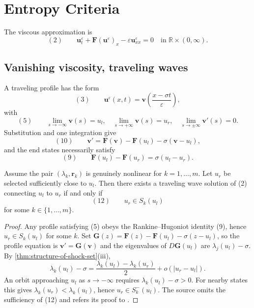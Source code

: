 \section{Entropy Criteria}\label{sec:entropy-criteria-systems}

The viscous approximation is
\[
(2)\qquad
\mathbf u_t^\varepsilon+\mathbf F(\mathbf u^\varepsilon)_x
-\varepsilon\mathbf u_{xx}^\varepsilon=0
\quad\text{in }\mathbb R\times(0,\infty).
\]

\subsection{Vanishing viscosity, traveling waves}\label{sec:vanishing-viscosity-traveling-waves}

A traveling profile has the form
\[
(3)\qquad \mathbf u^\varepsilon(x,t)
=\mathbf v\!\left(\frac{x-\sigma t}{\varepsilon}\right),
\]
with
\[
(5)\qquad
\lim_{s\to-\infty}\mathbf v(s)=u_l,
\quad \lim_{s\to+\infty}\mathbf v(s)=u_r,
\quad \lim_{s\to\pm\infty}\mathbf v'(s)=0.
\]
Substitution and one integration give
\[
(10)\qquad
\mathbf v'=\mathbf F(\mathbf v)-\mathbf F(u_l)-\sigma(\mathbf v-u_l),
\]
and the end states necessarily satisfy
\[
(9)\qquad \mathbf F(u_l)-\mathbf F(u_r)=\sigma(u_l-u_r).
\]

\begin{theorem}
\label{thm:existence-traveling-waves-genuinely-nonlinear}
Assume the pair $(\lambda_k, \mathbf{r}_k)$ is genuinely nonlinear for $k=1,\ldots,m$. Let $u_r$ be selected sufficiently close to $u_l$. Then there exists a traveling wave solution of (2) connecting $u_l$ to $u_r$ if and only if
$$(12) \qquad u_r \in S_k(u_l)$$
for some $k\in\{1,\ldots,m\}$.
\end{theorem}

\begin{proof}
\sketch Any profile satisfying (5) obeys the Rankine--Hugoniot identity (9), hence $u_r\in S_k(u_l)$ for some $k$. Set
$\mathbf G(z)=\mathbf F(z)-\mathbf F(u_l)-\sigma(z-u_l)$, so the profile equation is $\mathbf v'=\mathbf G(\mathbf v)$ and the eigenvalues of $D\mathbf G(u_l)$ are $\lambda_j(u_l)-\sigma$. By \cref{thm:structure-of-shock-set}(iii),
\[
\lambda_k(u_l)-\sigma
=\frac{\lambda_k(u_l)-\lambda_k(u_r)}{2}+o(|u_r-u_l|).
\]
An orbit approaching $u_l$ as $s\to-\infty$ requires $\lambda_k(u_l)-\sigma>0$. For nearby states this gives $\lambda_k(u_r)<\lambda_k(u_l)$, hence $u_r\in S_k^-(u_l)$. The source omits the sufficiency of (12) and refers its proof to \cite{MajdaPego1985}.
\end{proof}

